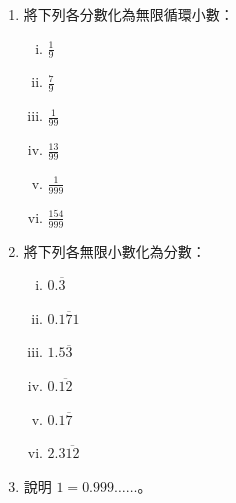 \begin{enumerate}
    \item 將下列各分數化為無限循環小數：
    \begin{enumerate}[(i)]
        \item $\frac{1}{9}$
        \item $\frac{7}{9}$
        \item $\frac{1}{99}$
        \item $\frac{13}{99}$
        \item $\frac{1}{999}$
        \item $\frac{154}{999}$
    \end{enumerate}

    \item 將下列各無限小數化為分數：
    \begin{enumerate}[(i)]
        \item $0.\overline{3}$
        \item $0.\overline{171}$
        \item $1.5\overline{3}$
        \item $0.\overline{12}$
        \item $0.1\overline{7}$
        \item $2.3\overline{12}$
    \end{enumerate}

    \item 說明 $1 = 0.999\dots\dots$。
\end{enumerate}
